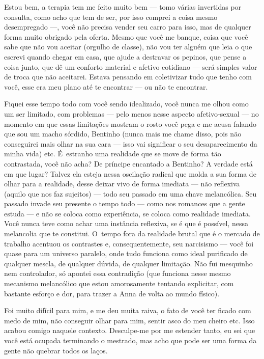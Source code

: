 Estou bem, a terapia tem me feito muito bem --- tomo várias invertidas
por consulta, como acho que tem de ser, por isso comprei a coisa mesmo
desempregado \mbox{---,} você não precisa vender seu carro para isso, mas de
qualquer forma muito obrigado pela oferta. Mesmo que você me banque,
coisa que você sabe que não vou aceitar (orgulho de classe), não vou ter
alguém que leia o que escrevi quando chegar em casa, que ajude a
destravar os pepinos, que pense a coisa junto, que dê um conforto
material e afetivo cotidiano --- será simples valor de troca que não
aceitarei. Estava pensando em coletivizar tudo que tenho com você, esse
era meu plano até te encontrar --- ou não te encontrar.

Fiquei esse tempo todo com você sendo idealizado, você nunca me olhou
como um ser limitado, com problemas --- pelo menos nesse aspecto
afetivo-sexual --- no momento em que essas limitações mostram o rosto
você pega e me acusa falando que sou um macho sórdido, Bentinho (nunca
mais me chame disso, pois não conseguirei mais olhar na sua cara ---
isso vai significar o seu desaparecimento da minha vida) etc. É~estranho
uma realidade que se move de forma tão contrastada, você não acha? De
príncipe encantado a Bentinho? A verdade está em que lugar? Talvez ela
esteja nessa oscilação radical que molda a sua forma de olhar para a
realidade, desse deixar vivo de forma imediata --- não reflexiva (aquilo
que nos faz sujeitos) --- todo seu passado em uma chave melancólica. Seu
passado invade seu presente o tempo todo --- como nos romances que a
gente estuda --- e não se coloca como experiência, se coloca como
realidade imediata. Você nunca teve como achar uma instância reflexiva,
se é que é possível, nessa melancolia que te constitui. O~tempo fora da
realidade brutal que é o mercado de trabalho acentuou os contrastes e,
consequentemente, seu narcisismo --- você foi quase para um universo
paralelo, onde tudo funciona como ideal purificado de qualquer mescla,
de qualquer dúvida, de qualquer limitação. Não fui mesquinho nem
controlador, só apontei essa contradição (que funciona nesse mesmo
mecanismo melancólico que estou amorosamente tentando explicitar, com
bastante esforço e dor, para trazer a Anna de volta ao mundo físico).

Foi muito difícil para mim, e me deu muita raiva, o fato de você ter
ficado com medo de mim, não conseguir olhar para mim, sentir asco do meu
cheiro etc. Isso acabou comigo naquele contexto. Desculpe-me por me
estender tanto, eu sei que você está ocupada terminando o mestrado, mas
acho que pode ser uma forma da gente não quebrar todos os laços.

